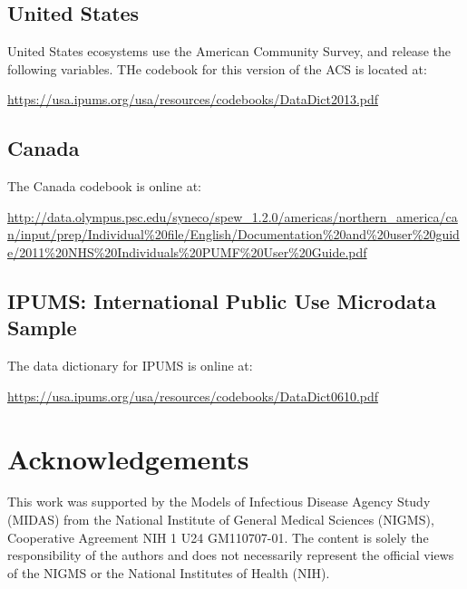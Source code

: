 \documentclass[font=9pt]{article}
\begin{document}
\subsection{United States}
United States ecosystems use the American Community Survey, and release the following variables. THe codebook for this version of the ACS is located at:

\vspace{2em}
	\url{https://usa.ipums.org/usa/resources/codebooks/DataDict2013.pdf}
\vspace{2em}

\subsection{Canada}
The Canada codebook is online at:

\vspace{2em}
	\url{http://data.olympus.psc.edu/syneco/spew_1.2.0/americas/northern_america/can/input/prep/Individual%20file/English/Documentation%20and%20user%20guide/2011%20NHS%20Individuals%20PUMF%20User%20Guide.pdf}
\vspace{2em}

\subsection{IPUMS: International Public Use Microdata Sample}
The data dictionary for IPUMS is online at:

\vspace{2em}
	\url{https://usa.ipums.org/usa/resources/codebooks/DataDict0610.pdf}
\vspace{2em}

\newpage 
\section{Acknowledgements}
This work was supported by the Models of Infectious Disease Agency Study (MIDAS) from the National Institute of General Medical Sciences (NIGMS), Cooperative Agreement NIH 1 U24 GM110707-01. The content is solely the responsibility of the authors and does not necessarily represent the official views of the NIGMS or the National Institutes of Health (NIH).
\end{document}
